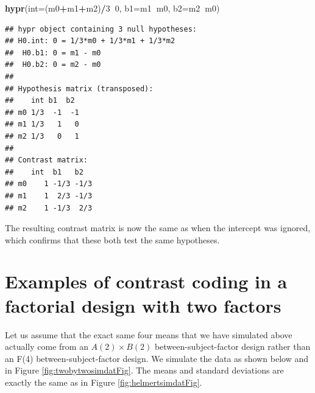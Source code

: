 \documentclass[12pt,]{krantz}
\newenvironment{Shaded}{\begin{snugshade}}{\end{snugshade}}
\newcommand{\KeywordTok}[1]{\textcolor[rgb]{0.13,0.29,0.53}{\textbf{#1}}}
\newcommand{\DataTypeTok}[1]{\textcolor[rgb]{0.13,0.29,0.53}{#1}}
\newcommand{\DecValTok}[1]{\textcolor[rgb]{0.00,0.00,0.81}{#1}}
\newcommand{\OperatorTok}[1]{\textcolor[rgb]{0.81,0.36,0.00}{\textbf{#1}}}
\newcommand{\NormalTok}[1]{#1}
\theoremstyle{definition}
\theoremstyle{definition}
\theoremstyle{definition}
\theoremstyle{remark}
\begin{document}
\begin{Shaded}
\begin{Highlighting}[]
\KeywordTok{hypr}\NormalTok{(}\DataTypeTok{int=}\NormalTok{(m0}\OperatorTok{+}\NormalTok{m1}\OperatorTok{+}\NormalTok{m2)}\OperatorTok{/}\DecValTok{3}\OperatorTok{~}\DecValTok{0}\NormalTok{, }\DataTypeTok{b1=}\NormalTok{m1}\OperatorTok{~}\NormalTok{m0, }\DataTypeTok{b2=}\NormalTok{m2}\OperatorTok{~}\NormalTok{m0)}
\end{Highlighting}
\end{Shaded}

\begin{verbatim}
## hypr object containing 3 null hypotheses:
## H0.int: 0 = 1/3*m0 + 1/3*m1 + 1/3*m2
##  H0.b1: 0 = m1 - m0
##  H0.b2: 0 = m2 - m0
## 
## Hypothesis matrix (transposed):
##    int b1  b2 
## m0 1/3  -1  -1
## m1 1/3   1   0
## m2 1/3   0   1
## 
## Contrast matrix:
##    int  b1   b2  
## m0    1 -1/3 -1/3
## m1    1  2/3 -1/3
## m2    1 -1/3  2/3
\end{verbatim}

The resulting contrast matrix is now the same as when the intercept was
ignored, which confirms that these both test the same hypotheses.

\section{Examples of contrast coding in a factorial design with two
factors}\label{MR_ANOVA}

Let us assume that the exact same four means that we have simulated
above actually come from an \(A(2) \times B(2)\) between-subject-factor
design rather than an F(4) between-subject-factor design. We simulate
the data as shown below and in Figure \ref{fig:twobytwosimdatFig}. The
means and standard deviations are exactly the same as in Figure
\ref{fig:helmertsimdatFig}.
\end{document}
